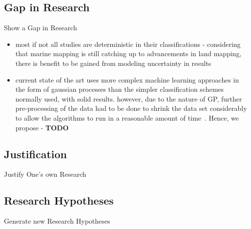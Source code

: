 \subsection{Gap in Research}
Show a Gap in Research
\begin{itemize}
    \item most if not all studies are deterministic in their classifications - considering that marine mapping is still catching up to advancements in land mapping, there is benefit to be gained from modeling uncertainty in results
    \item current state of the art uses more complex machine learning approaches in the form of gaussian processes than the simpler classification schemes normally used, with solid results. however, due to the nature of GP, further pre-processing of the data had to be done to shrink the data set considerably to allow the algorithms to run in a reasonable amount of time~\citep{bender12}. Hence, we propose - \textbf{TODO}
\end{itemize}

\subsection{Justification}
Justify One's own Research

\subsection{Research Hypotheses}
Generate new Research Hypotheses

